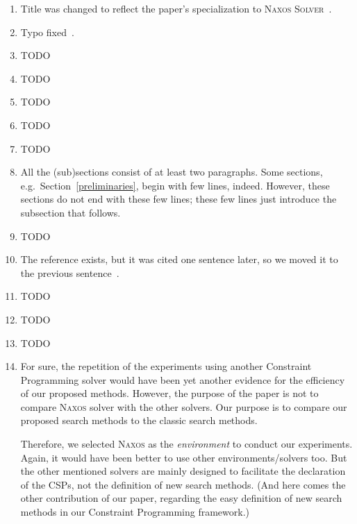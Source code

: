 \documentclass{ws-ijait}
\begin{document}
\begin{enumerate}
  \item Title was changed to reflect the paper's
        specialization to \textsc{Naxos
        Solver}~.
  \item Typo fixed~.
  \item TODO
  \item TODO
  \item TODO
  \item TODO
  \item TODO
  \item All the (sub)sections consist of at least two
        paragraphs. Some sections, e.g.\ 
        Section~\ref{preliminaries}, begin with few lines,
        indeed. However, these sections do not end with
        these few lines; these few lines just introduce the
        subsection that follows.
  \item TODO
  \item The reference exists, but it was cited one sentence
        later, so we moved it to the previous
        sentence~.
  \item TODO
  \item TODO
  \item TODO
  \item For sure, the repetition of the experiments using
        another Constraint Programming solver would have
        been yet another evidence for the efficiency of our
        proposed methods. However, the purpose of the paper
        is not to compare \textsc{Naxos} solver with the
        other solvers. Our purpose is to compare our
        proposed search methods to the classic search
        methods.

        Therefore, we selected \textsc{Naxos} as the
        \emph{environment} to conduct our experiments.
        Again, it would have been better to use other
        environments\slash solvers too. But the other
        mentioned solvers are mainly designed to facilitate
        the declaration of the CSPs, not the definition of
        new search methods. (And here comes the other
        contribution of our paper, regarding the easy
        definition of new search methods in our Constraint
        Programming framework.)
\end{enumerate}
\end{document}
